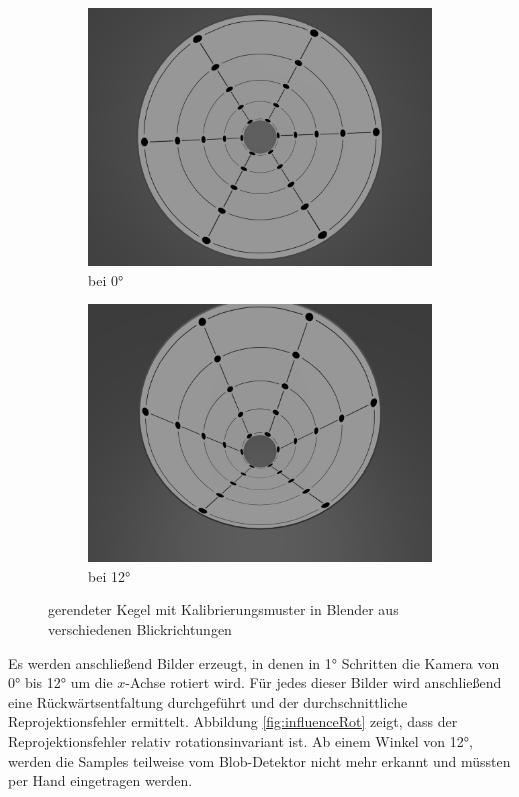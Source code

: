 \begin{figure}[!htb]
	\centering
	\begin{subfigure}{.5\textwidth}
		\centering
		\includegraphics[width=.9\textwidth]{images/blender0.png}
		\caption{bei 0°}
	\end{subfigure}%
	\begin{subfigure}{.5\textwidth}
		\centering
		\includegraphics[width=.9\textwidth]{images/blender12.png}
		\caption{bei 12°}
	\end{subfigure}
	\label{fig:blender}
	\caption{gerendeter Kegel mit Kalibrierungsmuster in Blender aus verschiedenen Blickrichtungen}
\end{figure}


Es werden anschließend Bilder erzeugt, in denen in 1° Schritten die Kamera von 0° bis 12° um die $x$-Achse rotiert wird. Für jedes dieser Bilder wird anschließend eine Rückwärtsentfaltung durchgeführt und der durchschnittliche Reprojektionsfehler ermittelt. Abbildung \ref{fig:influenceRot} zeigt, dass der Reprojektionsfehler relativ rotationsinvariant ist. Ab einem Winkel von  12°, werden die Samples teilweise vom Blob-Detektor nicht mehr erkannt und müssten per Hand eingetragen werden. 


